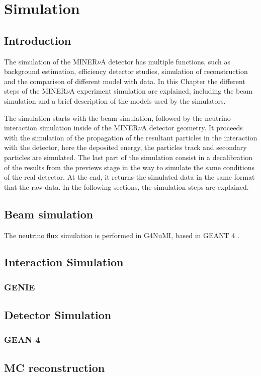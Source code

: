 \chapter{Simulation}
\minitoc
\label{Cap:Simulation}

\section{Introduction}
\label{Cap:Simulation:Introduction}
The simulation of the MINER$\nu$A detector has multiple functions, such as background estimation, efficiency detector studies, simulation of reconstruction and the comparison of different  model with data. In this Chapter the different steps of the MINER$\nu$A experiment simulation are explained, including the beam simulation and a brief description of the models used by the simulators.

The simulation starts with the beam simulation, followed by the neutrino interaction simulation inside of the MINER$\nu$A detector geometry. It proceeds with the simulation of the propagation of the resultant particles in the interaction with the detector, here the deposited energy, the particles track and secondary particles are simulated. The last part of the simulation consist in a decalibration of the results from the previews stage in the way to simulate the same conditions of the real detector. At the end, it returns the simulated data in the same format that the raw data. In the following sections, the simulation steps are explained.

\section{Beam simulation}
\label{Cap:Simulation:BeamSimulation}

The neutrino flux simulation is performed in G4NuMI, based in GEANT 4 \cite{GEANT4}. 





\section{Interaction Simulation}
\label{Cap:Simulation:InteractionSimulation}

\subsection{GENIE}
\label{Cap:Simulation:GENIE}

\section{Detector Simulation}
\label{Cap:Simulation:DetectorSimulation}

\subsection{GEAN 4}
\label{Cap:Simulation:GEANT4}

\section{MC reconstruction}
\label{Cap:Simulation:MCReconstruction}




